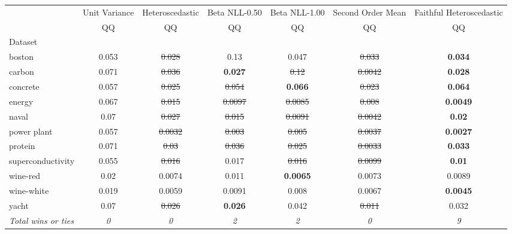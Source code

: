 \begin{tabular}{l|c|c|c|c|c|c}
\toprule
{} & {Unit Variance} & {Heteroscedastic} & {Beta NLL-0.50} & {Beta NLL-1.00} & {Second Order Mean} & {Faithful Heteroscedastic} \\
{} & {QQ} & {QQ} & {QQ} & {QQ} & {QQ} & {QQ} \\
{Dataset} & {} & {} & {} & {} & {} & {} \\
\midrule
boston & 0.053 & \sout{0.028} & 0.13 & 0.047 & \sout{0.033} & \textbf{0.034} \\
carbon & 0.071 & \sout{0.036} & \textbf{0.027} & \sout{0.12} & \sout{0.0042} & \textbf{0.028} \\
concrete & 0.057 & \sout{0.025} & \sout{0.054} & \textbf{0.066} & \sout{0.023} & \textbf{0.064} \\
energy & 0.067 & \sout{0.015} & \sout{0.0097} & \sout{0.0085} & \sout{0.008} & \textbf{0.0049} \\
naval & 0.07 & \sout{0.027} & \sout{0.015} & \sout{0.0091} & \sout{0.0042} & \textbf{0.02} \\
power plant & 0.057 & \sout{0.0032} & \sout{0.003} & \sout{0.005} & \sout{0.0037} & \textbf{0.0027} \\
protein & 0.071 & \sout{0.03} & \sout{0.036} & \sout{0.025} & \sout{0.0033} & \textbf{0.033} \\
superconductivity & 0.055 & \sout{0.016} & 0.017 & \sout{0.016} & \sout{0.0099} & \textbf{0.01} \\
wine-red & 0.02 & 0.0074 & 0.011 & \textbf{0.0065} & 0.0073 & 0.0089 \\
wine-white & 0.019 & 0.0059 & 0.0091 & 0.008 & 0.0067 & \textbf{0.0045} \\
yacht & 0.07 & \sout{0.026} & \textbf{0.026} & 0.042 & \sout{0.011} & 0.032 \\
\textit{{Total wins or ties}} & \textit{0} & \textit{0} & \textit{2} & \textit{2} & \textit{0} & \textit{9} \\
\bottomrule
\end{tabular}
